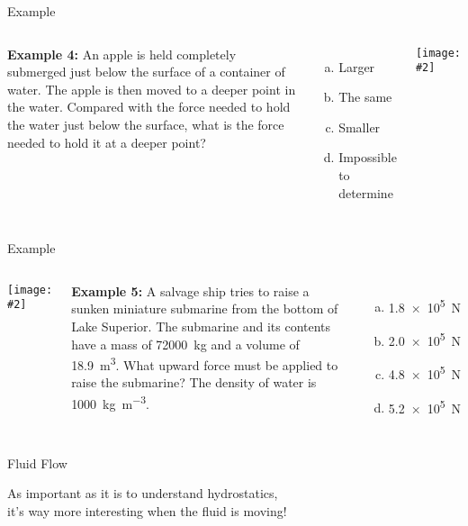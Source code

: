 \documentclass[12pt,aspectratio=169]{beamer}
\newcommand{\pic}[2]{\texttt{[image: \#2]}}
\begin{document}
\begin{frame}{Example}
  \begin{columns}
    \textbf{Example 4:} An apple is held completely submerged just below the
    surface of a container of water. The apple is then moved to a deeper point
    in the water. Compared with the force needed to hold the water just below
    the surface, what is the force needed to hold it at a deeper point?
    \begin{enumerate}[(a)]
    \item Larger
    \item The same
    \item Smaller
    \item Impossible to determine
    \end{enumerate}

    \pic{1}{apple.jpg}
  \end{columns}
\end{frame}



\begin{frame}{Example}
  \begin{columns}
    \pic{1}{hpa_b}

    \textbf{Example 5:} A salvage ship tries to raise a sunken miniature
    submarine from the bottom of Lake Superior. The submarine and its contents
    have a mass of \SI{72000}{\kilo\gram} and a volume of
    \SI{18.9}{\metre\cubed}.
    What upward force must be applied to raise the submarine? The density of
    water is \SI{1000}{\kilo\gram\per\metre\cubed}.
    \begin{enumerate}[(a)]
    \item\SI{1.8e5}\newton
    \item\SI{2.0e5}\newton
    \item\SI{4.8e5}\newton
    \item\SI{5.2e5}\newton
    \end{enumerate}
  \end{columns}
\end{frame}



\begin{frame}{Fluid Flow}
  \begin{center}
    As important as it is to understand hydrostatics,\\
    it's way more interesting when the fluid is moving!
  \end{center}
\end{frame}
\end{document}
